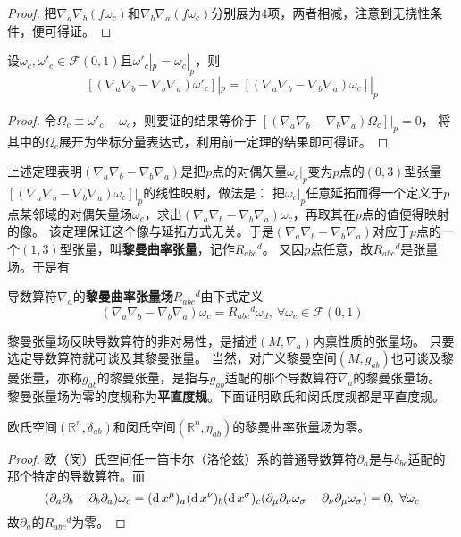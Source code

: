 \begin{proof}
把$\nabla_a\nabla_b(f\omega_c)$和$\nabla_b\nabla_a(f\omega_c)$分别展为$4$项，两者相减，注意到无挠性条件，便可得证。
\end{proof}

\begin{theorem}
设$\omega_c, \omega'_c \in \mathscr{F}(0, 1)$且$\omega'_c|_p = \omega_c|_p$，则
$$[(\nabla_a\nabla_b - \nabla_b\nabla_a)\omega'_c]|_p = [(\nabla_a\nabla_b - \nabla_b\nabla_a)\omega_c]|_p$$
\end{theorem}

\begin{proof}
令$\Omega_c \equiv \omega'_c - \omega_c$，则要证的结果等价于
$[(\nabla_a\nabla_b - \nabla_b\nabla_a)\Omega_c]|_p = 0$，
将其中的$\Omega_c$展开为坐标分量表达式，利用前一定理的结果即可得证。
\end{proof}

上述定理表明$(\nabla_a\nabla_b - \nabla_b\nabla_a)$是把$p$点的对偶矢量$\omega_c|_p$变为$p$点的$(0, 3)$型张量$[(\nabla_a\nabla_b - \nabla_b\nabla_a)\omega_c]|_p$的线性映射，做法是：
把$\omega_c|_p$任意延拓而得一个定义于$p$点某邻域的对偶矢量场$\omega_c$，求出$(\nabla_a\nabla_b - \nabla_b\nabla_a)\omega_c$，再取其在$p$点的值便得映射的像。
该定理保证这个像与延拓方式无关。于是$(\nabla_a\nabla_b - \nabla_b\nabla_a)$对应于$p$点的一个$(1, 3)$型张量，叫\textbf{黎曼曲率张量}，记作$R_{abc}{}^d$。
又因$p$点任意，故$R_{abc}{}^d$是张量场。于是有

\begin{definition}
导数算符$\nabla_a$的\textbf{黎曼曲率张量场}$R_{abc}{}^d$由下式定义
$$(\nabla_a\nabla_b - \nabla_b\nabla_a)\omega_c = R_{abc}{}^d\omega_d, ~ \forall \omega_c \in \mathscr{F}(0, 1)$$
\end{definition}

黎曼张量场反映导数算符的非对易性，是描述$(M, \nabla_a)$内禀性质的张量场。
只要选定导数算符就可谈及其黎曼张量。
当然，对广义黎曼空间$(M, g_{ab})$也可谈及黎曼张量，亦称$g_{ab}$的黎曼张量，是指与$g_{ab}$适配的那个导数算符$\nabla_a$的黎曼张量场。
黎曼张量场为零的度规称为\textbf{平直度规}。下面证明欧氏和闵氏度规都是平直度规。

\begin{theorem}
欧氏空间$(\mathbb{R}^n, \delta_{ab})$和闵氏空间$(\mathbb{R}^n, \eta_{ab})$的黎曼曲率张量场为零。
\end{theorem}

\begin{proof}
欧（闵）氏空间任一笛卡尔（洛伦兹）系的普通导数算符$\partial_a$是与$\delta_{bc}$适配的那个特定的导数算符。而
$$(\partial_a\partial_b - \partial_b\partial_a)\omega_c = (\operatorname{d} x^\mu)_a(\operatorname{d} x^\nu)_b(\operatorname{d} x^\sigma)_c(\partial_\mu\partial_\nu\omega_\sigma - \partial_\nu\partial_\mu\omega_\sigma) = 0, ~ \forall \omega_c$$
故$\partial_a$的$R_{abc}{}^d$为零。
\end{proof}

